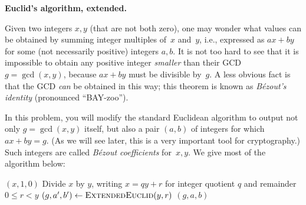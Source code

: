 \documentclass[11pt,addpoints]{exam}
\begin{document}
\begin{questions}
\begin{parts}
        \begin{solution}

        \end{solution}
        
    \end{parts}

    
  \question \textbf{Euclid's algorithm, extended.}

  
  Given two integers $x,y$ (that are not both zero), one may wonder what values can be obtained by summing integer multiples of~$x$ and~$y$, i.e., expressed as $ax+by$ for some (not necessarily positive) integers $a,b$.
  It is not too hard to see that it is impossible to obtain any positive integer \emph{smaller} than their GCD $g = \gcd(x,y)$, because $ax+by$ must be divisible by~$g$.
  A less obvious fact is that the GCD \emph{can} be obtained in this way; this theorem is known as \emph{B\'{e}zout's identity} (pronounced ``BAY-zoo'').
    
  In this problem, you will modify the standard Euclidean algorithm to output not only $g=\gcd(x,y)$ itself, but also a pair $(a,b)$ of integers for which $ax+by = g$.
  (As we will see later, this is a very important tool for cryptography.)
  Such integers are called \emph{B\'{e}zout coefficients} for~$x,y$.
  We give most of the algorithm below:
    
    \begin{minipage}{\linewidth}
      \begin{algorithm}[H]
        \begin{algorithmic}[1]
            \Statex
             \State \Return $(x,1,0)$
            \Else \State Divide $x$ by $y$, writing $x = qy + r$ for integer quotient $q$ and remainder $0\leq r < y$
            \State $(g,a',b') \gets \Call{ExtendedEuclid}{y,r}$
            \State \Return $(g, a, b)$
            \EndIf
            \EndFunction
        \end{algorithmic}
      \end{algorithm}
    \end{minipage}

  \begin{parts}
  

\end{parts}
\end{questions}
\end{document}
